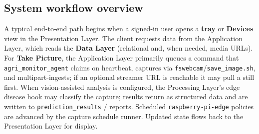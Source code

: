 \subsection{System workflow overview}

A typical end-to-end path begins when a signed-in user opens a \textbf{tray} or \textbf{Devices} view in the Presentation Layer. The client requests data from the Application Layer, which reads the \textbf{Data Layer} (relational and, when needed, media URLs). For \textbf{Take Picture}, the Application Layer primarily queues a command that \texttt{agri\_monitor\_agent} claims on heartbeat, captures via \texttt{fswebcam}/\texttt{save\_image.sh}, and multipart-ingests; if an optional streamer URL is reachable it may pull a still first. When vision-assisted analysis is configured, the Processing Layer's edge disease hook may classify the capture; results return as structured data and are written to \texttt{prediction\_results} / reports. Scheduled \texttt{raspberry-pi-edge} policies are advanced by the capture schedule runner. Updated state flows back to the Presentation Layer for display.
